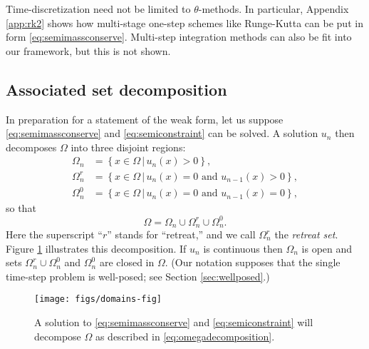 \documentclass[final,onefignum]{siamart190516}
\begin{document}
Time-discretization need not be limited to $\theta$-methods.  In particular, Appendix \ref{app:rk2} shows how multi-stage one-step schemes like Runge-Kutta can be put in form \eqref{eq:semimassconserve}.  Multi-step integration methods can also be fit into our framework, but this is not shown.


\subsection{Associated set decomposition}  \label{subsec:setdecompose}  In preparation for a statement of the weak form, let us suppose \eqref{eq:semimassconserve} and \eqref{eq:semiconstraint} can be solved.  A solution $u_n$ then decomposes $\Omega$ into three disjoint regions:
\begin{align*}
\Omega_n &= \left\{x \in \Omega \,\big|\, u_n(x)>0\right\}, \\
\Omega_n^r &= \left\{x \in \Omega \,\big|\, u_n(x)=0 \text{ and } u_{n-1}(x) > 0\right\}, \\
\Omega_n^0 &= \left\{x \in \Omega \,\big|\, u_n(x)=0 \text{ and } u_{n-1}(x) = 0\right\},
\end{align*}
so that
\begin{equation}
\Omega = \Omega_n \cup \Omega_n^r \cup \Omega_n^0.  \label{eq:omegadecomposition}
\end{equation}
Here the superscript ``$r$'' stands for ``retreat,'' and we call $\Omega_n^r$ the \emph{retreat set}.  Figure \ref{fig:domains} illustrates this decomposition.  If $u_n$ is continuous then $\Omega_n$ is open and sets $\Omega_n^r \cup \Omega_n^0$ and $\Omega_n^0$ are closed in $\Omega$.  (Our notation supposes that the single time-step problem is well-posed; see Section \ref{sec:wellposed}.)

\begin{figure}[ht]
\medskip
\begin{center}
\texttt{[image: figs/domains-fig]}
\end{center}
\caption{A solution to \eqref{eq:semimassconserve} and \eqref{eq:semiconstraint} will decompose $\Omega$ as described in \eqref{eq:omegadecomposition}.}
\label{fig:domains}
\end{figure}
\end{document}
